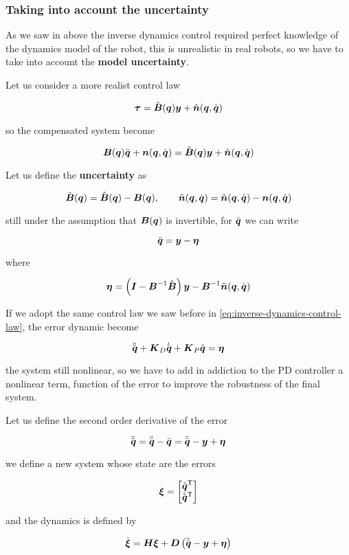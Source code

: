 \subsubsection{Taking into account the uncertainty}\label{subsubsec:inverse-dynamics-robust-control}

As we saw in above the inverse dynamics control required perfect knowledge of the dynamics model of the robot, this is unrealistic in real robots, so we have to take into account the \textbf{model uncertainty}.

Let us consider a more realist control law

\[
	\vect \tau = \Bs(\q) \vect y + \ns(\q,\dq)
\]

so the compensated system become

\[
	\B(\q)\ddq + \n(\q,\dq) = \Bs(\q) \y + \ns(\q,\dq)
\]

Let us define the \textbf{uncertainty} as

\[
	\Be(\q) = \Bs(\q) - \B(\q), \qquad
	\ner(\q,\dq) = \ns(\q, \dq) - \n(\q, \dq)
\]

still under the assumption that $\B(\q)$ is invertible, for $\ddq$ we can write

\[
	\ddq = \vect y - \vect \eta
\]

where

\[
	\vect\eta = \left( \I - \B^{-1} \Bs  \right)\y - \B^\inv \ner(\q,\dq)
\]

If we adopt the same control law we saw before in \autoref{eq:inverse-dynamics-control-law}, the error dynamic become

\[
	\ddqe + \matr K_D \dqe + \matr K_P \qe = \vect\eta
\]

the system still nonlinear, so we have to add in addiction to the PD controller a nonlinear term, function of the error to improve the robustness of the final system.

Let us define the second order derivative of the error

\[
	\ddqe = \ddqd - \ddq = \ddqd - \y + \vect \eta
\]

we define a new system whose state are the errors

\[
	\vect \xi = \begin{bmatrix} \qe^\trans \\ \dqe^\trans \end{bmatrix}
\]

and the dynamics is defined by

\[
	\dot{\vect\xi} = \matr H \vect\xi + \matr D \left( \ddqd - \y + \vect\eta \right)
\]

